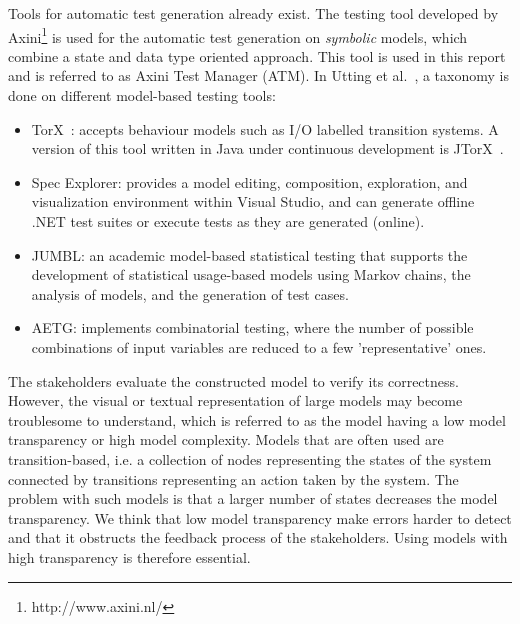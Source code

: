 Tools for automatic test generation already exist. The testing tool developed by Axini\footnote{http://www.axini.nl/} is used for the automatic test generation on \textit{symbolic} models, which combine a state and data type oriented approach. This tool is used in this report and is referred to as Axini Test Manager (ATM). In Utting et al.~\cite{Utting:MBTTaxonomy}, a taxonomy is done on different model-based testing tools:
\begin{itemize}
  \item TorX~\cite{Tretmans:TorX}: accepts behaviour models such as I/O labelled transition systems. A version of this tool written in Java under continuous development is JTorX~\cite{Belinfante:JTorX}.
  \item Spec Explorer\cite{Veanes:SpecExplorer}: provides a model editing, composition, exploration,
and visualization environment within Visual Studio, and can generate offline .NET test suites or
execute tests as they are generated (online).
  \item JUMBL\cite{Prowell:JUMBL}: an academic model-based statistical testing that supports the development of statistical usage-based models using Markov chains, the analysis of models, and the generation of test cases.
  \item AETG\cite{Cohen:AETG}: implements combinatorial testing, where the number of possible combinations of input variables are reduced to a few 'representative' ones.
\end{itemize}

The stakeholders evaluate the constructed model to verify its correctness. However, the visual or textual representation of large models may become troublesome to understand, which is referred to as the model having a low model transparency or high model complexity. Models that are often used are transition-based, i.e. a collection of nodes representing the states of the system connected by transitions representing an action taken by the system. The problem with such models is that a larger number of states decreases the model transparency. We think that low model transparency make errors harder to detect and that it obstructs the feedback process of the stakeholders. Using models with high transparency is therefore essential.

